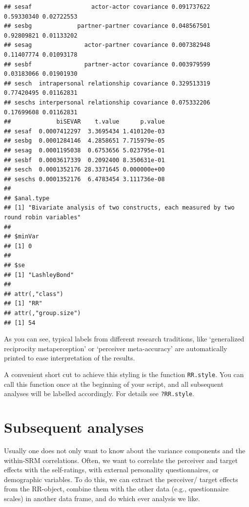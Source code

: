 \documentclass[a4paper]{article}\usepackage[]{graphicx}\usepackage[]{color}
\makeatletter
\newenvironment{kframe}{%
 \def\at@end@of@kframe{}%
 \ifinner\ifhmode%
  \def\at@end@of@kframe{\end{minipage}}%
  \begin{minipage}{\columnwidth}%
 \fi\fi%
 \def\FrameCommand##1{\hskip\@totalleftmargin \hskip-\fboxsep
 \colorbox{shadecolor}{##1}\hskip-\fboxsep
     \hskip-\linewidth \hskip-\@totalleftmargin \hskip\columnwidth}%
 \MakeFramed {\advance\hsize-\width
   \@totalleftmargin\z@ \linewidth\hsize
   \@setminipage}}%
 {\par\unskip\endMakeFramed%
 \at@end@of@kframe}
\newenvironment{knitrout}{}{} %
\makeatother
\begin{document}
\begin{knitrout}
\begin{kframe}
\begin{verbatim}
## sesaf                 actor-actor covariance 0.091737622   0.59330340 0.02722553
## sesbg             partner-partner covariance 0.048567501   0.92809821 0.01133202
## sesag               actor-partner covariance 0.007382948   0.11407774 0.01093178
## sesbf               partner-actor covariance 0.003979599   0.03183066 0.01901930
## sesch  intrapersonal relationship covariance 0.329513319   0.77420495 0.01162831
## seschs interpersonal relationship covariance 0.075332206   0.17699608 0.01162831
##             biSEVAR    t.value      p.value
## sesaf  0.0007412297  3.3695434 1.410120e-03
## sesbg  0.0001284146  4.2858651 7.715979e-05
## sesag  0.0001195038  0.6753656 5.023795e-01
## sesbf  0.0003617339  0.2092400 8.350631e-01
## sesch  0.0001352176 28.3371645 0.000000e+00
## seschs 0.0001352176  6.4783454 3.111736e-08
## 
## $anal.type
## [1] "Bivariate analysis of two constructs, each measured by two round robin variables"
## 
## $minVar
## [1] 0
## 
## $se
## [1] "LashleyBond"
## 
## attr(,"class")
## [1] "RR"
## attr(,"group.size")
## [1] 54
\end{verbatim}
\end{kframe}
\end{knitrout}
\par\vspace{5mm}

As you can see, typical labels from different research traditions, like `generalized reciprocity metaperception' or `perceiver meta-accuracy' are automatically printed to ease interpretation of the results.

A convenient short cut to achieve this styling is the function \texttt{RR.style}. You can call this function once at the beginning of your script, and all subsequent analyses will be labelled accordingly. For details see \texttt{?RR.style}.



\section{Subsequent analyses} %
\label{sec:subsequent_analyses}
Usually one does not only want to know about the variance components and the within-SRM correlations. Often, we want to correlate the perceiver and target effects with the self-ratings, with external personality questionnaires, or demographic variables. To do this, we can extract the perceiver/ target effects from the RR-object, combine them with the other data (e.g., questionnaire scales) in another data frame, and do which ever analysis we like.
\end{document}
